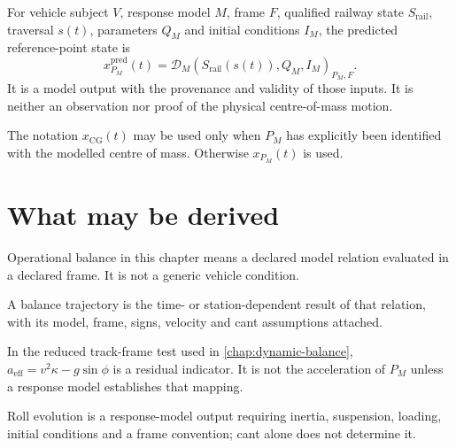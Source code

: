 \begin{definition}
\label{def:cg-state}
For vehicle subject \(V\), response model \(M\), frame \(F\), qualified
railway state \(S_{\mathrm{rail}}\), traversal \(s(t)\), parameters \(Q_M\)
and initial conditions \(I_M\), the predicted reference-point state is
\[
x_{P_M}^{\mathrm{pred}}(t)
=
\mathcal D_M(S_{\mathrm{rail}}(s(t)),Q_M,I_M)_{{P_M},F}.
\]
It is a model output with the provenance and validity of those inputs. It is
neither an observation nor proof of the physical centre-of-mass motion.
\end{definition}

\begin{definition}
\label{def:cg-trajectory}
The notation \(x_{\mathrm{CG}}(t)\) may be used only when \(P_M\) has explicitly
been identified with the modelled centre of mass. Otherwise
\(x_{P_M}(t)\) is used.
\end{definition}

\section{What may be derived}

\begin{definition}
\label{def:operational-balance}
Operational balance in this chapter means a declared model relation evaluated
in a declared frame. It is not a generic vehicle condition.
\end{definition}

\begin{definition}
\label{def:balance-trajectory}
A balance trajectory is the time- or station-dependent result of that
relation, with its model, frame, signs, velocity and cant assumptions attached.
\end{definition}

\begin{definition}
\label{def:effective-operational-acceleration}
In the reduced track-frame test used in \cref{chap:dynamic-balance},
\(a_{\mathrm{eff}}=v^2\kappa-g\sin\phi\) is a residual indicator. It is not
the acceleration of \(P_M\) unless a response model establishes that mapping.
\end{definition}

\begin{definition}
\label{def:roll-evolution}
Roll evolution is a response-model output requiring inertia, suspension,
loading, initial conditions and a frame convention; cant alone does not
determine it.
\end{definition}

